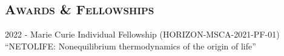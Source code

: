 \documentclass[margin,line,centered]{res}
\begin{document}
\begin{resume}











\section{\textsc{Awards \& Fellowships}}
2022 - Marie Curie Individual Fellowship (HORIZON-MSCA-2021-PF-01)\\
``NETOLIFE: Nonequilibrium thermodynamics of the origin of life''


\end{resume}
\end{document}
